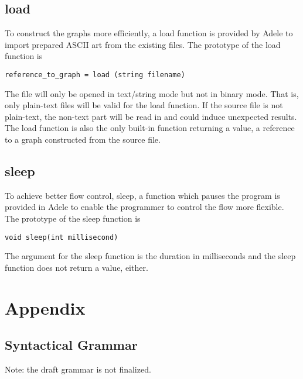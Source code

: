 \documentclass[11pt,letterpaper]{article}
\begin{document}
\subsection {load}
To construct the graphs more efficiently, a load function is provided by Adele to import prepared ASCII art from the existing files. The prototype of the load function is
\begin{lstlisting}[tabsize=4]
	reference_to_graph = load (string filename)
\end{lstlisting}	
The file will only be opened in text/string mode but not in binary mode. That is, only plain-text files will be valid for the load function. If the source file is not plain-text, the non-text part will be read in and could induce unexpected results. The load function is also the only built-in function returning a value, a reference to a graph constructed from the source file.

\subsection {sleep}
To achieve better flow control, sleep, a function which pauses the program is provided in Adele to enable the programmer to control the flow more flexible. The prototype of the sleep function is
\begin{lstlisting}[tabsize=4]
	void sleep(int millisecond)
\end{lstlisting}	
The argument for the sleep function is the duration in milliseconds and the sleep function does not return a value, either.

\pagebreak
\section {Appendix}
\subsection {Syntactical Grammar}
Note: the draft grammar is not finalized.
\end{document}

